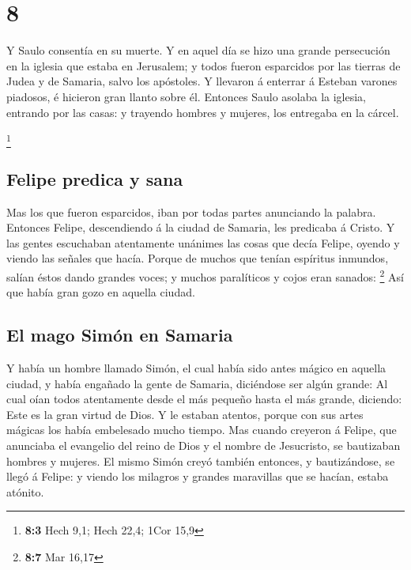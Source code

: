 \hypertarget{section-7}{%
\section{8}\label{section-7}}

 Y Saulo consentía en su muerte. Y en aquel día se hizo
una grande persecución en la iglesia que estaba en Jerusalem; y todos
fueron esparcidos por las tierras de Judea y de Samaria, salvo los
apóstoles.  Y llevaron á enterrar á Esteban varones
piadosos, é hicieron gran llanto sobre él.  Entonces Saulo
asolaba la iglesia, entrando por las casas: y trayendo hombres y
mujeres, los entregaba en la cárcel.

\footnote{\textbf{8:3} Hech 9,1; Hech 22,4; 1Cor 15,9}

\hypertarget{felipe-predica-y-sana}{%
\subsection{Felipe predica y sana}\label{felipe-predica-y-sana}}

 Mas los que fueron esparcidos, iban por todas partes
anunciando la palabra.  Entonces Felipe, descendiendo á la
ciudad de Samaria, les predicaba á Cristo.  Y las gentes
escuchaban atentamente unánimes las cosas que decía Felipe, oyendo y
viendo las señales que hacía.  Porque de muchos que tenían
espíritus inmundos, salían éstos dando grandes voces; y muchos
paralíticos y cojos eran sanados: \footnote{\textbf{8:7} Mar 16,17}
 Así que había gran gozo en aquella ciudad.

\hypertarget{el-mago-simuxf3n-en-samaria}{%
\subsection{El mago Simón en
Samaria}\label{el-mago-simuxf3n-en-samaria}}

 Y había un hombre llamado Simón, el cual había sido antes
mágico en aquella ciudad, y había engañado la gente de Samaria,
diciéndose ser algún grande:  Al cual oían todos
atentamente desde el más pequeño hasta el más grande, diciendo: Este es
la gran virtud de Dios.  Y le estaban atentos, porque con
sus artes mágicas los había embelesado mucho tiempo.  Mas
cuando creyeron á Felipe, que anunciaba el evangelio del reino de Dios y
el nombre de Jesucristo, se bautizaban hombres y mujeres.
 El mismo Simón creyó también entonces, y bautizándose,
se llegó á Felipe: y viendo los milagros y grandes maravillas que se
hacían, estaba atónito.

